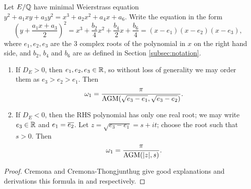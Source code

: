 \begin{proposition}\label{prop:real_period_by_AGM}
Let $E/\mathbb{Q}$ have minimal Weierstrass equation $y^2 + a_1 xy + a_3 y^2 = x^3 + a_2 x^2 + a_4 x + a_6$. Write the equation in the form
\begin{equation}\label{eqn:weierstrass_with_bn}
\left(y + \frac{a_1x + a_3}{2}\right)^2 = x^3 + \frac{b_2}{4} x^2 + \frac{b_4}{2} x + \frac{b_6}{4} = (x-e_1)(x-e_2)(x-e_3),
\end{equation}
where $e_1,e_2,e_3$ are the 3 complex roots of the polynomial in $x$ on the right hand side, and $b_2$, $b_4$ and $b_6$ are as defined in Section \ref{subsec:notation}.
\begin{enumerate}
\item If $D_E > 0$, then $e_1,e_2,e_3 \in \mathbb{R}$, so without loss of generality we may order them as $e_3 > e_2 > e_1$. Then
\begin{equation}\label{eqn:omega_D_pos}
\omega_1 = \frac{\pi}{\text{AGM}(\sqrt{e_3-e_1},\sqrt{e_3-e_2})}.
\end{equation}
\item If $D_E < 0$, then the RHS polynomial has only one real root; we may write $e_3 \in \mathbb{R}$ and $e_1 = \overline{e_2}$. Let $z = \sqrt{e_3-e_1} = s + it$; choose the root such that $s>0$. Then
\begin{equation}\label{eqn:omega_D_neg}
\omega_1 = \frac{\pi}{\text{AGM}(|z|,s)}.
\end{equation}
\end{enumerate}
\end{proposition}
\begin{proof}
Cremona and Cremona-Thongjunthug give good explanations and derivations this formula in \cite{Cre-1997} and \cite{Cre-2013} respectively.
\end{proof}

